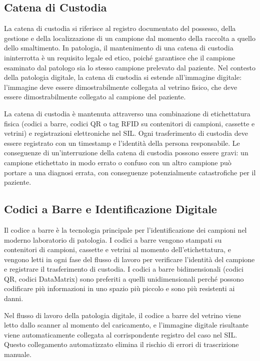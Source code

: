 \subsection{Catena di Custodia}

La catena di custodia si riferisce al registro documentato del possesso, della gestione e della
localizzazione di un campione dal momento della raccolta a quello dello smaltimento. In patologia,
il mantenimento di una catena di custodia ininterrotta è un requisito legale ed etico, poiché
garantisce che il campione esaminato dal patologo sia lo stesso campione prelevato dal paziente.
Nel contesto della patologia digitale, la catena di custodia si estende all'immagine digitale:
l'immagine deve essere dimostrabilmente collegata al vetrino fisico, che deve essere
dimostrabilmente collegato al campione del paziente.

La catena di custodia è mantenuta attraverso una combinazione di etichettatura fisica (codici a
barre, codici QR o tag RFID su contenitori di campioni, cassette e vetrini) e registrazioni
elettroniche nel SIL. Ogni trasferimento di custodia deve essere registrato con un timestamp e
l'identità della persona responsabile. Le conseguenze di un'interruzione della catena di custodia
possono essere gravi: un campione etichettato in modo errato o confuso con un altro campione può
portare a una diagnosi errata, con conseguenze potenzialmente catastrofiche per il paziente.

\subsection{Codici a Barre e Identificazione Digitale}

Il codice a barre è la tecnologia principale per l'identificazione dei campioni nel moderno
laboratorio di patologia. I codici a barre vengono stampati su contenitori di campioni, cassette
e vetrini al momento dell'etichettatura, e vengono letti in ogni fase del flusso di lavoro per
verificare l'identità del campione e registrare il trasferimento di custodia. I codici a barre
bidimensionali (codici QR, codici DataMatrix) sono preferiti a quelli unidimensionali perché
possono codificare più informazioni in uno spazio più piccolo e sono più resistenti ai danni.

Nel flusso di lavoro della patologia digitale, il codice a barre del vetrino viene letto dallo
scanner al momento del caricamento, e l'immagine digitale risultante viene automaticamente
collegata al corrispondente registro del caso nel SIL. Questo collegamento automatizzato elimina
il rischio di errori di trascrizione manuale.

